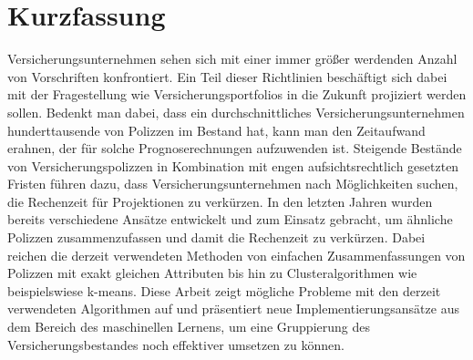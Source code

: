 

\chapter*{Kurzfassung}
\label{cha:kurzfassung}


Versicherungsunternehmen sehen sich mit einer immer größer werdenden Anzahl von Vorschriften konfrontiert. Ein Teil dieser Richtlinien beschäftigt sich dabei mit der Fragestellung wie Versicherungsportfolios in die Zukunft projiziert werden sollen. Bedenkt man dabei, dass ein durchschnittliches Versicherungsunternehmen hunderttausende von Polizzen im Bestand hat, kann man den Zeitaufwand erahnen, der für solche Prognoserechnungen aufzuwenden ist. Steigende Bestände von Versicherungspolizzen in Kombination mit engen aufsichtsrechtlich gesetzten Fristen führen dazu, dass Versicherungsunternehmen nach Möglichkeiten suchen, die Rechenzeit für Projektionen zu verkürzen. In den letzten Jahren wurden bereits verschiedene Ansätze entwickelt und zum Einsatz gebracht, um ähnliche Polizzen zusammenzufassen und damit die Rechenzeit zu verkürzen. Dabei reichen die derzeit verwendeten Methoden von einfachen Zusammenfassungen von Polizzen mit exakt gleichen Attributen bis hin zu Clusteralgorithmen wie beispielswiese k-means. Diese Arbeit zeigt mögliche Probleme mit den derzeit verwendeten Algorithmen auf und präsentiert neue Implementierungsansätze aus dem Bereich des maschinellen Lernens, um eine Gruppierung des Versicherungsbestandes noch effektiver umsetzen zu können.
